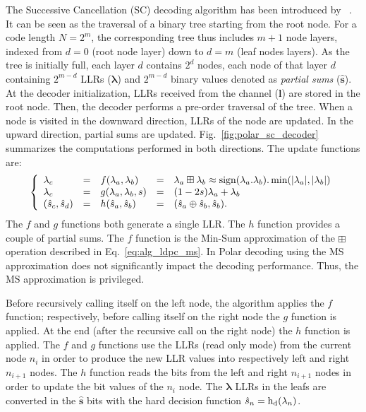The Successive Cancellation (SC) decoding algorithm has been introduced by
\Arikan~\cite{Arikan2009}. It can be seen as the traversal of a binary tree
starting from the root node. For a code length $N=2^m$, the corresponding tree
thus includes $m + 1$ node layers, indexed from $d=0$ (root node layer) down to
$d=m$ (leaf nodes layers). As the tree is initially full, each layer $d$
contains $2^d$ nodes, each node of that layer $d$ containing $2^{m-d}$ LLRs
($\bm{\lambda}$) and $2^{m-d}$ binary values denoted as \textit{partial sums}
($\bm{\hat{s}}$). At the decoder initialization, LLRs received from the channel
($\bm{l}$) are stored in the root node. Then, the decoder performs a pre-order
traversal of the tree. When a node is visited in the downward direction, LLRs of
the node are updated. In the upward direction, partial sums are updated.
Fig.~\ref{fig:polar_sc_decoder} summarizes the computations performed in both
directions. The update functions are:
\begin{eqnarray}
\left\{\begin{array}{l c l c l}
\lambda_c &=& f(\lambda_a,\lambda_b) &=& \lambda_a \boxplus \lambda_b \approx \operatorname*{sign}(\lambda_a.\lambda_b).\min(|\lambda_a|,|\lambda_b|)\\
\lambda_c &=& g(\lambda_a,\lambda_b,s)&=&(1-2s)\lambda_a+\lambda_b\\
(\hat{s}_{c}, \hat{s}_{d}) &=& h(\hat{s}_{a}, \hat{s}_{b}) &=& (\hat{s}_{a} \oplus \hat{s}_{b}, \hat{s}_{b}).
\end{array}\right.
\label{eq:polar_f_g_h}
\end{eqnarray}
The $f$ and $g$ functions both generate a single LLR. The $h$ function provides
a couple of partial sums. The $f$ function is the Min-Sum approximation of the
$\boxplus$ operation described in Eq.~\ref{eq:alg_ldpc_ms}. In Polar decoding
using the MS approximation does not significantly impact the decoding
performance. Thus, the MS approximation is privileged.

Before recursively calling itself on the left node, the algorithm applies the
$f$ function; respectively, before calling itself on the right node the $g$
function is applied. At the end (after the recursive call on the right node) the
$h$ function is applied. The $f$ and $g$ functions use the LLRs (read only mode)
from the current node $n_i$ in order to produce the new LLR values into
respectively left and right $n_{i+1}$ nodes. The $h$ function reads the bits
from the left and right $n_{i+1}$ nodes in order to update the bit values of the
$n_i$ node. The $\bm{\lambda}$ LLRs in the leafs are converted in the
$\bm{\hat{s}}$ bits with the hard decision function $\hat{s}_n =
\operatorname{h_d}(\lambda_n)$.

